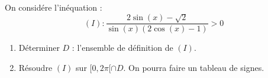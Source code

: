 \documentclass[a4paper, 11pt]{article}
\begin{document}
\begin{correction}
\begin{enumerate}

\end{enumerate}
\end{correction}



\begin{exercice}
    On considére l'inéquation : 
    $$(I) : \frac{2\sin(x) - \sqrt{2}}{\sin(x)(2\cos(x)-1)}>0$$
    \begin{enumerate}
        \item Déterminer $D$ : l'ensemble de définition de $(I)$.
        \item Résoudre $(I)$ sur $[0,2\pi[\cap D$. On pourra faire un tableau de signes. 
    \end{enumerate}
\end{exercice}
\end{document}
